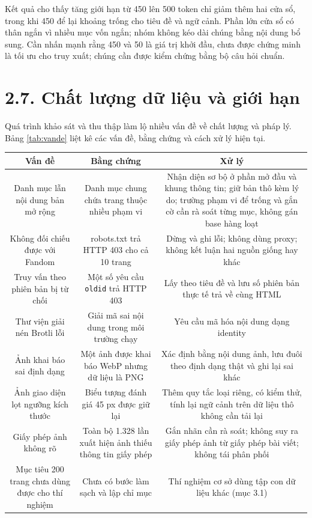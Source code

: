 Kết quả cho thấy tăng giới hạn từ 450 lên 500 token chỉ giảm thêm hai cửa sổ, trong khi 450 để lại khoảng trống cho tiêu đề và ngữ cảnh. Phần lớn cửa sổ có thân ngắn vì nhiều mục vốn ngắn; nhóm không kéo dài chúng bằng nội dung bổ sung. Cần nhấn mạnh rằng 450 và 50 là giá trị khởi đầu, chưa được chứng minh là tối ưu cho truy xuất; chúng cần được kiểm chứng bằng bộ câu hỏi chuẩn.


\section{2.7. Chất lượng dữ liệu và giới hạn}

Quá trình khảo sát và thu thập làm lộ nhiều vấn đề về chất lượng và pháp lý. Bảng \ref{tab:vande} liệt kê các vấn đề, bằng chứng và cách xử lý hiện tại.


\begin{longtable*}{|C{0.25}|C{0.37}|C{0.38}|}
\hline \textbf{Vấn đề} & \textbf{Bằng chứng} & \textbf{Xử lý} \\ \hline
Danh mục lẫn nội dung bản mở rộng & Danh mục chung chứa trang thuộc nhiều phạm vi & Nhận diện sơ bộ ở phần mở đầu và khung thông tin; giữ bản thô kèm lý do; trường phạm vi để trống và gắn cờ cần rà soát từng mục, không gán base hàng loạt \\ \hline
Không đối chiếu được với Fandom & robots.txt trả HTTP 403 cho cả 10 trang & Dừng và ghi lỗi; không dùng proxy; không kết luận hai nguồn giống hay khác \\ \hline
Truy vấn theo phiên bản bị từ chối & Một số yêu cầu \texttt{oldid} trả HTTP 403 & Lấy theo tiêu đề và lưu số phiên bản thực tế trả về cùng HTML \\ \hline
Thư viện giải nén Brotli lỗi & Giải mã sai nội dung trong môi trường chạy & Yêu cầu mã hóa nội dung dạng identity \\ \hline
Ảnh khai báo sai định dạng & Một ảnh được khai báo WebP nhưng dữ liệu là PNG & Xác định bằng nội dung ảnh, lưu đuôi theo định dạng thật và ghi lại sai khác \\ \hline
Ảnh giao diện lọt ngưỡng kích thước & Biểu tượng đánh giá 45 px được giữ lại & Thêm quy tắc loại riêng, có kiểm thử, tính lại ngữ cảnh trên dữ liệu thô không cần tải lại \\ \hline
Giấy phép ảnh không rõ & Toàn bộ 1.328 lần xuất hiện ảnh thiếu thông tin giấy phép & Gắn nhãn cần rà soát; không suy ra giấy phép ảnh từ giấy phép bài viết; không tái phân phối \\ \hline
Mục tiêu 200 trang chưa dùng được cho thí nghiệm & Chưa có bước làm sạch và lập chỉ mục & Thí nghiệm cơ sở dùng tập con dữ liệu khác (mục 3.1) \\ \hline
\end{longtable*}
\tabend


